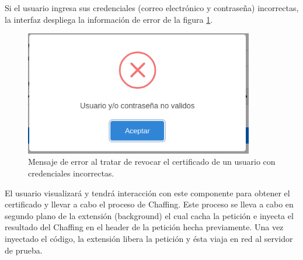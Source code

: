 \documentclass[12pt, a4paper, titlepage]{report}
\begin{document}
			Si el usuario ingresa sus credenciales (correo electrónico y contraseña) incorrectas, la interfaz despliega la información de error de la figura \ref{fig:UI_revocacionFallo}.
    			
    			\begin{figure}[H]
    				\begin{center}	\includegraphics[width=10cm]{./imagenes/Disenio/Componente_1/UI_revocacionFallo.PNG}
    					\caption[Mensaje de error]{Mensaje de error al tratar de revocar el certificado de un usuario con credenciales incorrectas.}
    				\label{fig:UI_revocacionFallo}
    				\end{center}
    			\end{figure}
    			
			El usuario visualizará y tendrá interacción con este componente para obtener el certificado y llevar a cabo el proceso de Chaffing. Este proceso se lleva a cabo en segundo plano de la extensión (background) el cual cacha la petición e inyecta el resultado del Chaffing en el header de la petición hecha previamente. Una vez inyectado el código, la extensión libera la petición y ésta viaja en red al servidor de prueba.
			
			
	
\end{document}

